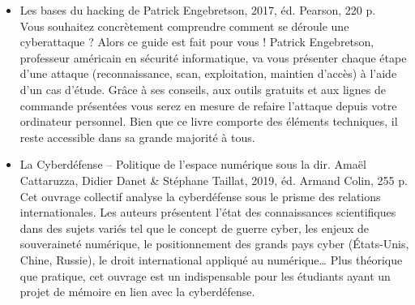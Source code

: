 \documentclass[a4paper]{article}
\begin{document}
\begin{itemize}
\item Les bases du hacking de Patrick Engebretson, 2017, éd. Pearson, 220 p.
\\
Vous souhaitez concrètement comprendre comment se déroule une cyberattaque ? Alors ce guide est fait pour vous ! Patrick Engebretson, professeur américain en sécurité informatique, va vous présenter chaque étape d’une attaque (reconnaissance, scan, exploitation, maintien d’accès) à l’aide d’un cas d’étude. Grâce à ses conseils, aux outils gratuits et aux lignes de commande présentées vous serez en mesure de refaire l’attaque depuis votre ordinateur personnel. Bien que ce livre comporte des éléments techniques, il reste accessible dans sa grande majorité à tous.


\item La Cyberdéfense – Politique de l’espace numérique sous la dir. Amaël Cattaruzza, Didier Danet & Stéphane Taillat, 2019, éd. Armand Colin, 255 p.
\\
Cet ouvrage collectif analyse la cyberdéfense sous le prisme des relations internationales. Les auteurs présentent l’état des connaissances scientifiques dans des sujets variés tel que le concept de guerre cyber, les enjeux de souveraineté numérique, le positionnement des grands pays cyber (États-Unis, Chine, Russie), le droit international appliqué au numérique… Plus théorique que pratique, cet ouvrage est un indispensable pour les étudiants ayant un projet de mémoire en lien avec la cyberdéfense.

\end{itemize}
\end{document}
